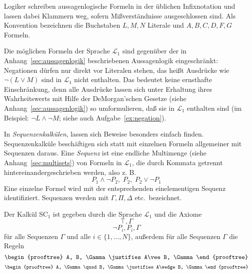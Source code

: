 Logiker schreiben aussagenlogische Formeln in
der üblichen Infixnotation und lassen dabei Klammern weg, sofern
Mißverständnisse ausgeschlossen sind.
%
Als Konvention bezeichnen die Buchstaben $L, M, N$  Literale 
und $A, B, C, D, F, G$ Formeln.

Die möglichen Formeln der Sprache $\mathcal{L}_1$ sind gegenüber der
in Anhang~\ref{sec:aussagenlogik} beschriebenen Aussagenlogik eingeschränkt:
Negationen dürfen nur direkt vor Literalen stehen, das heißt Ausdrücke wie
$\neg(L\vee M)$ sind in $\mathcal{L}_1$ nicht enthalten.  Das bedeutet 
keine ernsthafte Einschränkung, denn alle Ausdrücke lassen sich unter Erhaltung 
ihres Wahrheitswerts
mit Hilfe der DeMorgan'schen Gesetze (siehe Anhang~\ref{sec:aussagenlogik})
so umformulieren, daß sie in $\mathcal{L}_1$ enthalten
sind (im Beispiel: $\neg L\wedge \neg M$; siehe auch
Aufgabe~\ref{ex:negation}). 

In \textit{Sequenzenkalkülen},
lassen sich Beweise besonders einfach finden.
Sequenzenkalküle beschäftigen sich statt mit einzelnen Formeln
allgemeiner mit Sequenzen daraus.
Eine \textit{Sequenz} ist eine endliche Multimenge
(siehe Anhang~\ref{sec:multisets}) von Formeln in
$\mathcal{L}_1$, die durch Kommata getrennt
hintereinandergeschrieben werden, also z. B.\
\[P_1\wedge\neg P_2,\; P_2,\; P_2\vee\neg P_1\] 
Eine einzelne Formel wird mit der entsprechenden einelementigen Sequenz
identifiziert.  
Sequenzen werden mit $\Gamma, \Pi, \Delta$ etc.\ bezeichnet.  


\begin{definition}[Kalkül SC$_1$]
Der Kalkül SC$_1$ ist gegeben durch die Sprache $\mathcal{L}_1$ und die
Axiome 
%
\begin{equation}
\top, \Gamma
\label{S1}
\end{equation}
\begin{equation}
\neg P_i, P_i, \Gamma
\label{S2}
\end{equation}
für alle Sequenzen $\Gamma$ und alle $i\in\{1,\ldots,N\}$, außerdem für alle
Sequenzen $\Gamma$ die Regeln
%
\begin{equation}
\begin{prooftree}
  A, B, \Gamma \justifies A\vee B, \Gamma
\end{prooftree}
\label{Sd}
\end{equation}
\begin{equation}
  \begin{prooftree}
    A, \Gamma \quad B, \Gamma \justifies A\wedge B, \Gamma
  \end{prooftree}
\label{Sc}
\end{equation}
%
\end{definition}


